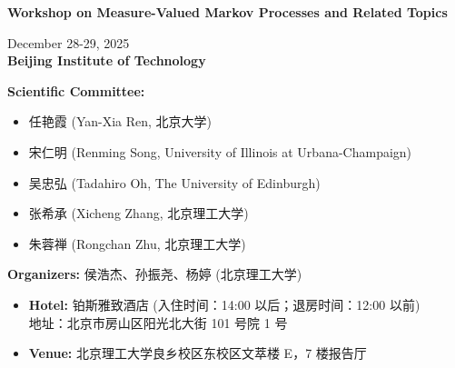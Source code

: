 \documentclass[a4paper,12pt]{article}
\begin{document}
\begin{center}
    {\Large\bfseries\color{titleblue} Workshop on Measure-Valued Markov Processes and Related Topics}
\end{center}

\vspace{2cm}

\begin{center}
    {\large December 28-29, 2025}\\[1em]
    {\large\bfseries Beijing Institute of Technology}
\end{center}

\vspace{2cm}

\noindent\textbf{Scientific Committee:}
\begin{itemize}
    \item[] 任艳霞 (Yan-Xia Ren, 北京大学)
    \item[] 宋仁明 (Renming Song, University of Illinois at Urbana-Champaign)
    \item[] 吴忠弘 (Tadahiro Oh, The University of Edinburgh)
    \item[] 张希承 (Xicheng Zhang, 北京理工大学)
    \item[] 朱蓉禅 (Rongchan Zhu, 北京理工大学)
\end{itemize}

\vspace{1cm}

\noindent\textbf{Organizers:} 侯浩杰、孙振尧、杨婷 (北京理工大学)

\vfill

\noindent
\begin{itemize}
    \item \textbf{Hotel:} 铂斯雅致酒店 (入住时间：14:00 以后；退房时间：12:00 以前) \\
    地址：北京市房山区阳光北大街 101 号院 1 号
    
    \item \textbf{Venue:} 北京理工大学良乡校区东校区文萃楼 E，7 楼报告厅
\end{itemize}
\end{document}

